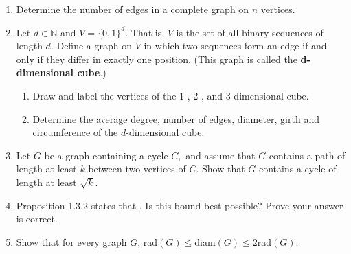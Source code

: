 \documentclass[12pt]{article}
\renewcommand{\emph}[1]{\textsf{\textbf{#1}}}
\newcommand{\bbN}{\mathbb{N}}
\newcommand{\rad}{\text{rad}}
\newcommand{\diam}{\text{diam}}
\begin{document}
\begin{enumerate}
\item Determine the number of edges in a complete graph on $n$ vertices.
\item Let $d \in \bbN$ and $V=\{0,1\}^d.$ That is, $V$ is the set of all binary sequences of length $d.$ Define a graph on $V$ in which two sequences form an edge if and only if they differ in exactly one position. (This graph is called the \emph{d-dimensional cube}.) 
	\begin{enumerate}
	\item Draw and label the vertices of the 1-, 2-, and 3-dimensional cube.
	\item Determine the average degree, number of edges, diameter, girth and circumference of the $d$-dimensional cube.
	\end{enumerate}
\item  Let $G$ be a graph containing a cycle $C,$ and assume that $G$ contains a path of length at least $k$ between two vertices of $C.$ Show that $G$ contains a cycle of length at least $\sqrt{k}$.
\item Proposition 1.3.2 states that . Is this bound best possible? Prove your answer is correct.
\item Show that for every graph $G$, $\rad(G) \leq \diam(G) \leq 2\rad(G).$
\end{enumerate}
\end{document}
